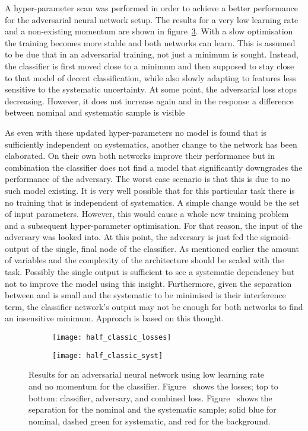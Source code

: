 A hyper-parameter scan was performed in order to achieve a better performance for the adversarial neural network setup. The results for a very low learning rate and a non-existing momentum are shown in figure~\ref{fig:app1:half}.
With a slow optimisation the training becomes more stable and both networks can learn. This is assumed to be due that in an adversarial training, not just a minimum is sought. Instead, the classifier is first moved close to a minimum and then supposed to stay close to that model of decent classification, while also slowly adapting to features less sensitive to the systematic uncertainty. At some point, the adversarial loss stops decreasing. However, it does not increase again and in the response a difference between nominal and systematic sample is visible

As even with these updated hyper-parameters no model is found that is sufficiently independent on systematics, another change to the network has been elaborated.
On their own both networks improve their performance but in combination the classifier does not find a model that significantly downgrades the performance of the adversary.
The worst case scenario is that this is due to no such model existing. It is very well possible that for this particular task there is no training that is independent of systematics.
A simple change would be the set of input parameters. However, this would cause a whole new training problem and a subsequent hyper-parameter optimisation. For that reason, the input of the adversary was looked into. At this point, the adversary is just fed the sigmoid-output of the single, final node of the classifier. As mentioned earlier the amount of variables and the complexity of the architecture should be scaled with the task. Possibly the single output is sufficient to see a systematic dependency but not to improve the model using this insight. Furthermore, given the separation between \tW and \ttbar is small and the systematic to be minimised is their interference term, the classifier network's output may not be enough for both networks to find an insensitive minimum. Approach  is based on this thought.

\begin{figure}[htbp]
    \centering
    \begin{subfigure}[b]{0.45\textwidth}
        \texttt{[image: half\_classic\_losses]}
        \caption{}
        \label{fig:app1:half:losses}
    \end{subfigure}
\quad
    \begin{subfigure}[b]{0.45\textwidth}
        \texttt{[image: half\_classic\_syst]}
        \caption{}
        \label{fig:app1:half:syst}
    \end{subfigure}
    \caption{Results for an adversarial neural network using low learning rate and no momentum for the classifier. Figure~ shows the losses; top to bottom: classifier, adversary, and combined loss. Figure~ shows the separation for the nominal and the systematic sample; solid blue for nominal, dashed green for systematic, and red for the background.}
	\label{fig:app1:half}
\end{figure}


